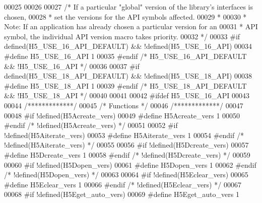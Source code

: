 \begin{DoxyCode}
00025 
00026 
00027 \textcolor{comment}{/* If a particular "global" version of the library's interfaces is chosen,}
00028 \textcolor{comment}{ *      set the versions for the API symbols affected.}
00029 \textcolor{comment}{ *}
00030 \textcolor{comment}{ * Note: If an application has already chosen a particular version for an}
00031 \textcolor{comment}{ *      API symbol, the individual API version macro takes priority.}
00032 \textcolor{comment}{ */}
00033 \textcolor{preprocessor}{#if defined(H5\_USE\_16\_API\_DEFAULT) && !defined(H5\_USE\_16\_API)}
00034 \textcolor{preprocessor}{  #define H5\_USE\_16\_API 1}
00035 \textcolor{preprocessor}{#endif }\textcolor{comment}{/* H5\_USE\_16\_API\_DEFAULT && !H5\_USE\_16\_API */}\textcolor{preprocessor}{}
00036 
00037 \textcolor{preprocessor}{#if defined(H5\_USE\_18\_API\_DEFAULT) && !defined(H5\_USE\_18\_API)}
00038 \textcolor{preprocessor}{  #define H5\_USE\_18\_API 1}
00039 \textcolor{preprocessor}{#endif }\textcolor{comment}{/* H5\_USE\_18\_API\_DEFAULT && !H5\_USE\_18\_API */}\textcolor{preprocessor}{}
00040 
00041 
00042 \textcolor{preprocessor}{#ifdef H5\_USE\_16\_API}
00043 
00044 \textcolor{comment}{/*************/}
00045 \textcolor{comment}{/* Functions */}
00046 \textcolor{comment}{/*************/}
00047 
00048 \textcolor{preprocessor}{#if !defined(H5Acreate\_vers)}
00049 \textcolor{preprocessor}{  #define H5Acreate\_vers 1}
00050 \textcolor{preprocessor}{#endif }\textcolor{comment}{/* !defined(H5Acreate\_vers) */}\textcolor{preprocessor}{}
00051 
00052 \textcolor{preprocessor}{#if !defined(H5Aiterate\_vers)}
00053 \textcolor{preprocessor}{  #define H5Aiterate\_vers 1}
00054 \textcolor{preprocessor}{#endif }\textcolor{comment}{/* !defined(H5Aiterate\_vers) */}\textcolor{preprocessor}{}
00055 
00056 \textcolor{preprocessor}{#if !defined(H5Dcreate\_vers)}
00057 \textcolor{preprocessor}{  #define H5Dcreate\_vers 1}
00058 \textcolor{preprocessor}{#endif }\textcolor{comment}{/* !defined(H5Dcreate\_vers) */}\textcolor{preprocessor}{}
00059 
00060 \textcolor{preprocessor}{#if !defined(H5Dopen\_vers)}
00061 \textcolor{preprocessor}{  #define H5Dopen\_vers 1}
00062 \textcolor{preprocessor}{#endif }\textcolor{comment}{/* !defined(H5Dopen\_vers) */}\textcolor{preprocessor}{}
00063 
00064 \textcolor{preprocessor}{#if !defined(H5Eclear\_vers)}
00065 \textcolor{preprocessor}{  #define H5Eclear\_vers 1}
00066 \textcolor{preprocessor}{#endif }\textcolor{comment}{/* !defined(H5Eclear\_vers) */}\textcolor{preprocessor}{}
00067 
00068 \textcolor{preprocessor}{#if !defined(H5Eget\_auto\_vers)}
00069 \textcolor{preprocessor}{  #define H5Eget\_auto\_vers 1}

\end{DoxyCode}
